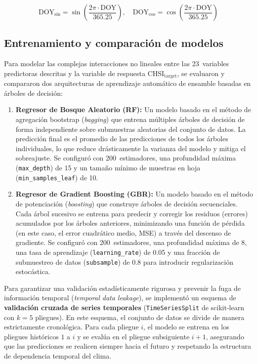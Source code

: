 \documentclass[12pt, a4paper]{article}
\begin{document}
\begin{enumerate}
    \begin{equation}
        \text{DOY}_{\text{sin}} = \sin\left(\frac{2\pi \cdot \text{DOY}}{365.25}\right), \quad \text{DOY}_{\text{cos}} = \cos\left(\frac{2\pi \cdot \text{DOY}}{365.25}\right)
    \end{equation}
\end{enumerate}

\subsection{Entrenamiento y comparación de modelos}
\label{subsec:modelos}

Para modelar las complejas interacciones no lineales entre las 23~variables predictoras descritas y la variable de respuesta $\text{CHSI}_{\text{target}}$, se evaluaron y compararon dos arquitecturas de aprendizaje automático de ensamble basadas en árboles de decisión:

\begin{enumerate}
    \item \textbf{Regresor de Bosque Aleatorio (RF):} Un modelo basado en el método de agregación bootstrap (\emph{bagging}) que entrena múltiples árboles de decisión de forma independiente sobre submuestras aleatorias del conjunto de datos. La predicción final es el promedio de las predicciones de todos los árboles individuales, lo que reduce drásticamente la varianza del modelo y mitiga el sobreajuste. Se configuró con 200~estimadores, una profundidad máxima (\texttt{max\_depth}) de 15 y un tamaño mínimo de muestras en hoja (\texttt{min\_samples\_leaf}) de 10.
    \item \textbf{Regresor de Gradient Boosting (GBR):} Un modelo basado en el método de potenciación (\emph{boosting}) que construye árboles de decisión secuenciales. Cada árbol sucesivo se entrena para predecir y corregir los residuos (errores) acumulados por los árboles anteriores, minimizando una función de pérdida (en este caso, el error cuadrático medio, MSE) a través del descenso de gradiente. Se configuró con 200~estimadores, una profundidad máxima de 8, una tasa de aprendizaje (\texttt{learning\_rate}) de 0.05 y una fracción de submuestreo de datos (\texttt{subsample}) de 0.8 para introducir regularización estocástica.
\end{enumerate}

Para garantizar una validación estadísticamente rigurosa y prevenir la fuga de información temporal (\emph{temporal data leakage}), se implementó un esquema de \textbf{validación cruzada de series temporales} (\texttt{TimeSeriesSplit} de scikit-learn con $k = 5$ pliegues). En este esquema, el conjunto de datos se divide de manera estrictamente cronológica. Para cada pliegue $i$, el modelo se entrena en los pliegues históricos $1$ a $i$ y se evalúa en el pliegue subsiguiente $i+1$, asegurando que las predicciones se realicen siempre hacia el futuro y respetando la estructura de dependencia temporal del clima.
\end{document}
